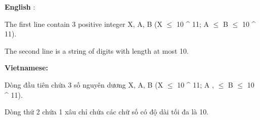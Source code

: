 \textbf{    English   }   :  

   The first line contain 3 positive integer X, A, B (X  $\le$  10 ^ 11; A  $\le$  B  $\le$  10 ^ 11).  

   The second line is a string of digits with length at most 10.  

\textbf{    Vietnamese:   }

   Dòng đầu tiên chứa 3 số nguyên dương X, A, B (X  $\le$  10 ^ 11; A , $\le$  B  $\le$  10 ^ 11).  

   Dòng thứ 2 chứa 1 xâu chỉ chứa các chữ số có độ dài tối đa là 10.